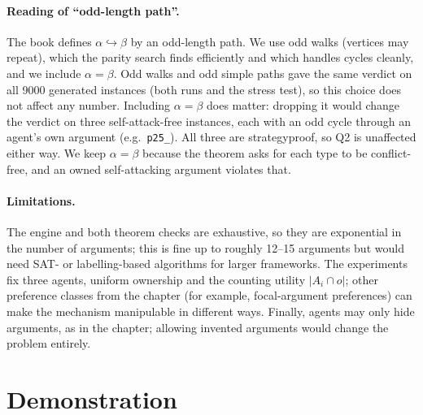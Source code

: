 \documentclass[11pt,a4paper]{article}
\newcommand{\odd}{\hookrightarrow}
\newcommand{\code}[1]{{\let\origus\_\renewcommand{\_}{\origus\allowbreak}\texttt{#1}}}
\theoremstyle{definition}
\begin{document}
\paragraph{Reading of ``odd-length path''.} The book defines $\alpha\odd\beta$ by an odd-length path.
We use odd walks (vertices may repeat), which the parity search finds efficiently and which handles
cycles cleanly, and we include $\alpha=\beta$. Odd walks and odd simple paths gave the same verdict on
all 9000 generated instances (both runs and the stress test), so this choice does not affect any
number. Including $\alpha=\beta$ does matter: dropping it would change the verdict on three
self-attack-free instances, each with an odd cycle through an agent's own argument (e.g.\
\code{p25\_0187}). All three are strategyproof, so Q2 is unaffected either way. We keep $\alpha=\beta$
because the theorem asks for each type to be conflict-free, and an owned self-attacking argument
violates that.

\paragraph{Limitations.} The engine and both theorem checks are exhaustive, so they are exponential in
the number of arguments; this is fine up to roughly 12--15 arguments but would need SAT- or
labelling-based algorithms for larger frameworks. The experiments fix three agents, uniform
ownership and the counting utility $|A_i\cap o|$; other preference classes from the chapter (for
example, focal-argument preferences) can make the mechanism manipulable in different ways. Finally,
agents may only hide arguments, as in the chapter; allowing invented arguments would change the
problem entirely.

\section{Demonstration}\label{sec:demo}
\end{document}

